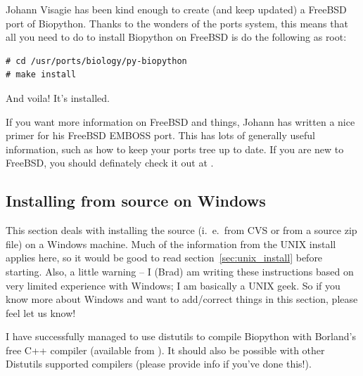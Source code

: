 \documentclass{report}
\begin{document}
Johann Visagie has been kind enough to create (and keep updated) a FreeBSD port of Biopython. Thanks to the wonders of the ports system, this means that all you need to do to install Biopython on FreeBSD is do the following as root:

\begin{verbatim}
# cd /usr/ports/biology/py-biopython
# make install
\end{verbatim}

And voila! It's installed. 


If you want more information on FreeBSD and things, Johann has written a nice primer for his FreeBSD EMBOSS port. This has lots of generally useful information, such as how to keep your ports tree up to date. If you are new to FreeBSD, you should definately check it out at .

\subsection{Installing from source on Windows}
\label{sec:windows_install}

This section deals with installing the source (i.~e.~from CVS or from a source zip file) on a Windows machine. Much of the information from the UNIX install applies here, so it would be good to read section~\ref{sec:unix_install} before starting. Also, a little warning -- I (Brad) am writing these instructions based on very limited experience with Windows; I am basically a UNIX geek. So if you know more about Windows and want to add/correct things in this section, please feel let us know!


I have successfully managed to use distutils to compile Biopython with Borland's free C++ compiler (available from ). It should also be possible with other Distutils supported compilers (please provide info if you've done this!).
\end{document}
